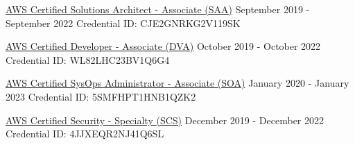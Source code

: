 \documentclass[letterpaper]{awesome-cv}
\begin{document}
\begin{cventries}
  \cventry
    {
      \href{https://www.certmetrics.com/amazon/public/badge.aspx?i=1\&t=c\&d=2019-09-12\&ci=AWS00457357}{AWS Certified Solutions Architect - Associate (SAA)}
    }
    {September 2019 - September 2022}
    {Credential ID: CJE2GNRKG2V119SK}
    {}
    {}

  \cventry
    {
      \href{https://www.certmetrics.com/amazon/public/badge.aspx?i=2\&t=c\&d=2019-10-09\&ci=AWS00457357}{AWS Certified Developer - Associate (DVA)}
    }
    {October 2019 - October 2022}
    {Credential ID: WL82LHC23BV1Q6G4}
    {}
    {}

  \cventry
    {
      \href{https://www.certmetrics.com/amazon/public/badge.aspx?i=3&t=c&d=2020-01-04&ci=AWS00457357}{AWS Certified SysOps Administrator - Associate (SOA)}
    }
    {January 2020 - January 2023}
    {Credential ID: 5SMFHPT1HNB1QZK2}
    {}
    {}

  \cventry
    {
      \href{https://www.certmetrics.com/amazon/public/badge.aspx?i=7&t=c&d=2019-12-18&ci=AWS00457357}{AWS Certified Security - Specialty (SCS)}
    }
    {December 2019 - December 2022}
    {Credential ID: 4JJXEQR2NJ41Q6SL}
    {}
    {}

\end{cventries}
\end{document}

